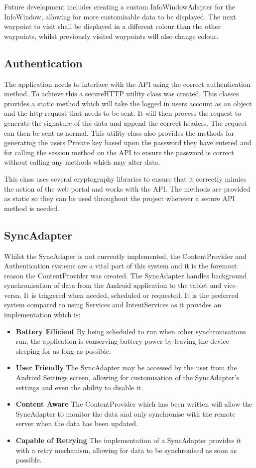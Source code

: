 \documentclass[11pt,a4paper]{article}
\begin{document}
Future development includes creating a custom InfoWindowAdapter for the InfoWindow, allowing for more customisable data to be displayed. The next waypoint to visit shall be displayed in a different colour than the other waypoints, whilst previously visited waypoints will also change colour.

\subsection{Authentication}
\label{sec:authorisation}
The application needs to interface with the API using the correct authentication method. To achieve this a secureHTTP utility class was created. This classes provides a static method which will take the logged in users account as an object and the http request that needs to be sent. It will then process the request to generate the signature of the data and append the correct headers. The request can then be sent as normal. This utility class also provides the methods for generating the users Private key based upon the password they have entered and for calling the session method on the API to ensure the password is correct without calling any methods which may alter data. 

This class uses several cryptography libraries to ensure that it correctly mimics the action of the web portal and works with the API. The methods are provided as static so they can be used throughout the project wherever a secure API method is needed.

\subsection{SyncAdapter}
\label{sec:syncAdapter}
Whilst the SyncAdaper is not currently implemented, the ContentProvider and Authentication systems are a vital part of this system and it is the foremost reason the ContentProvider was created. The SyncAdapter handles background synchronisation of data from the Android application to the tablet and vice-versa. It is triggered when needed, scheduled or requested. It is the preferred system compared to using Services and IntentServices as it provides an implementation which is:
\begin{itemize}
\item \textbf{Battery Efficient} By being scheduled to run when other synchronisations run, the application is conserving battery power by leaving the device sleeping for as long as possible.
\item \textbf{User Friendly} The SyncAdapter may be accessed by the user from the Android Settings screen, allowing for customisation of the SyncAdapter's settings and even the ability to disable it.
\item \textbf{Content Aware} The ContentProvider which has been written will allow the SyncAdapter to monitor the data and only synchronise with the remote server when the data has been updated.
\item \textbf{Capable of Retrying} The implementation of a SyncAdapter provides it with a retry mechanism, allowing for data to be synchronised as soon as possible.
\end{itemize}
\end{document}
